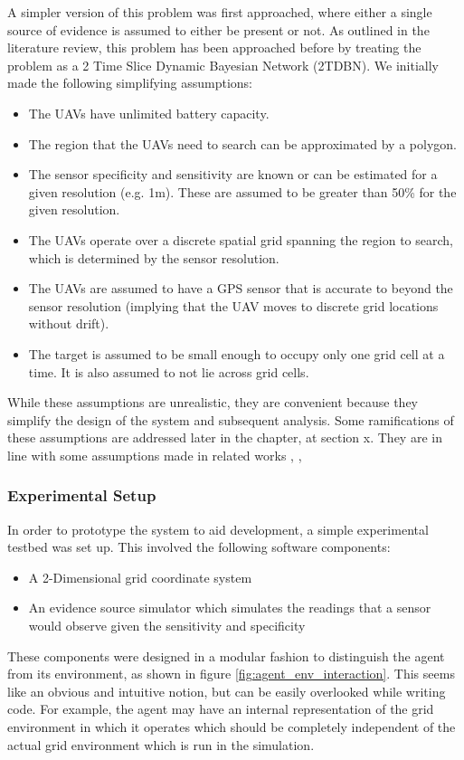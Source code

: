 A simpler version of this problem was first approached, where either a single source of evidence is assumed to either be present or not. As outlined in the literature review, this problem has been approached before by treating the problem as a 2 Time Slice Dynamic Bayesian Network (2TDBN). We initially made the following simplifying assumptions:
\begin{itemize}
    \item The UAVs have unlimited battery capacity.
    \item The region that the UAVs need to search can be approximated by a polygon.
    \item The sensor specificity and sensitivity are known or can be estimated for a given resolution (e.g. 1m). These are assumed to be greater than 50\% for the given resolution.
    \item The UAVs operate over a discrete spatial grid spanning the region to search, which is determined by the sensor resolution.
    \item The UAVs are assumed to have a GPS sensor that is accurate to beyond the sensor resolution (implying that the UAV moves to discrete grid locations without drift).
    \item The target is assumed to be small enough to occupy only one grid cell at a time. It is also assumed to not lie across grid cells.
\end{itemize}
While these assumptions are unrealistic, they are convenient because they simplify the design of the system and subsequent analysis. Some ramifications of these assumptions are addressed later in the chapter, at section x. They are in line with some assumptions made in related works \cite{ChungASearch}, \cite{Waharte2010SupportingUAVs}, %

\subsubsection{Experimental Setup}
In order to prototype the system to aid development, a simple experimental testbed was set up. This involved the following software components:
\begin{itemize}
    \item A 2-Dimensional grid coordinate system
    \item An evidence source simulator which simulates the readings that a sensor would observe given the sensitivity and specificity 
\end{itemize}
These components were designed in a modular fashion to distinguish the agent from its environment, as shown in figure \ref{fig:agent_env_interaction}. This seems like an obvious and intuitive notion, but can be easily overlooked while writing code. For example, the agent may have an internal representation of the grid environment in which it operates which should be completely independent of the actual grid environment which is run in the simulation. 




